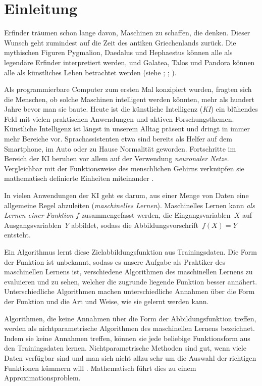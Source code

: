 \chapter*{Einleitung}

Erfinder träumen schon lange davon, Maschinen zu schaffen, die denken. Dieser Wunsch geht zumindest auf die Zeit des antiken Griechenlands zurück. Die mythischen Figuren Pygmalion, Daedalus und Hephaestus können alle als legendäre Erfinder interpretiert werden, und Galatea, Talos und Pandora können alle als künstliches Leben betrachtet werden (siehe \cite{2005metamorphoses}; \cite{sparkes1996red}; \cite{hesiod1996works}).

Als programmierbare Computer zum ersten Mal konzipiert wurden, fragten sich die Menschen, ob solche Maschinen intelligent werden könnten, mehr als hundert Jahre bevor man sie baute. Heute ist die künstliche Intelligenz (\emph{KI}) ein blühendes Feld mit vielen praktischen Anwendungen und aktiven Forschungsthemen. 
Künstliche Intelligenz ist längst in unserem Alltag präsent und dringt in immer mehr Bereiche vor. Sprachassistenten etwa sind bereits als Helfer auf dem Smartphone, im Auto oder zu Hause Normalität geworden. Fortschritte im Bereich der KI beruhen vor allem auf der Verwendung \emph{neuronaler Netze}. Vergleichbar mit der Funktionsweise des menschlichen Gehirns verknüpfen sie mathematisch definierte Einheiten miteinander \cite{goodfellow2016deep}.

In vielen Anwendungen der KI geht es darum, aus einer Menge von Daten eine allgemeine Regel abzuleiten (\emph{maschinelles Lernen}). Maschinelles Lernen kann \emph{als Lernen einer Funktion} $f$ zusammengefasst werden, die Eingangsvariablen~$X$ auf Ausgangsvariablen~$Y$ abbildet, sodass die Abbildungsvorschrift~$f(X) = Y$ entsteht.

Ein Algorithmus lernt diese Zielabbildungsfunktion aus Trainingsdaten.
Die Form der Funktion ist unbekannt, sodass es unsere Aufgabe als Praktiker des maschinellen Lernens ist, verschiedene Algorithmen des maschinellen Lernens zu evaluieren und zu sehen, welcher die zugrunde liegende Funktion besser annähert.
Unterschiedliche Algorithmen machen unterschiedliche Annahmen über die Form der Funktion und die Art und Weise, wie sie gelernt werden kann.

Algorithmen, die keine Annahmen über die Form der Abbildungsfunktion treffen, werden als nichtparametrische Algorithmen des maschinellen Lernens bezeichnet. Indem sie keine Annahmen treffen, können sie jede beliebige Funktionsform aus den Trainingsdaten lernen.
Nichtparametrische Methoden sind gut, wenn viele Daten verfügbar sind und man sich nicht allzu sehr um die Auswahl der richtigen Funktionen kümmern will \cite[Seite 757]{AI}. Mathematisch führt dies zu einem Approximationsproblem. 


